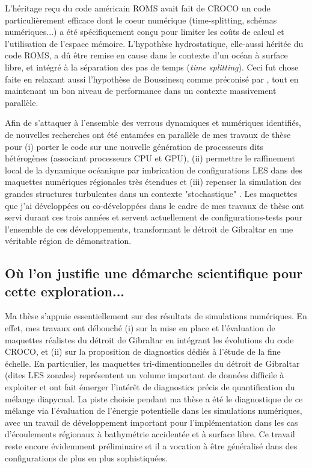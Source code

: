 L'héritage reçu du code américain ROMS \citep{shchepetkin_regional_2005} avait fait de CROCO un code particulièrement efficace dont le coeur numérique (time-splitting, schémas numériques...) a été spécifiquement conçu pour limiter les coûts de calcul et l'utilisation de l'espace mémoire. L'hypothèse hydrostatique, elle-aussi héritée du code ROMS, a dû être remise en cause dans le contexte d'un océan à surface libre, et intégré à la séparation des pas de temps (\textit{time splitting}). Ceci fut chose faite en relaxant aussi l'hypothèse de Boussinesq comme préconisé par \cite{Auclair2018}, tout en maintenant un bon niveau de performance dans un contexte massivement parallèle.


Afin de s'attaquer à l'ensemble des verrous dynamiques et numériques identifiés, de nouvelles recherches ont été entamées en parallèle de mes travaux de thèse pour (i) porter le code sur une nouvelle génération de processeurs dits hétérogènes (associant processeurs CPU et GPU), (ii) permettre le raffinement local de la dynamique océanique par imbrication de configurations LES dans des maquettes numériques régionales très étendues et (iii) repenser la simulation des grandes structures turbulentes dans un contexte "stochastique" \cite{memin_fluid_2014}. Les maquettes que j'ai développées ou co-développées dans le cadre de mes travaux de thèse ont servi durant ces trois années et servent actuellement de configurations-tests pour l'ensemble de ces développements, transformant le détroit de Gibraltar en une véritable région de démonstration.

\subsection{Où l'on justifie une démarche scientifique pour cette exploration...}

Ma thèse s'appuie essentiellement sur des résultats de simulations numériques. En effet, mes travaux ont débouché (i) sur la mise en place et l'évaluation de maquettes réalistes du détroit de Gibraltar en intégrant les évolutions du code CROCO, et (ii) sur la proposition de diagnostics dédiés à l'étude de la fine échelle. En particulier, les maquettes tri-dimentionnelles du détroit de Gibraltar (dites LES zonales) représentent un volume important de données difficile à exploiter et ont fait émerger l'intérêt de diagnostics précis de quantification du mélange diapycnal. La piste choisie pendant ma thèse a été le diagnostique de ce mélange via l'évaluation de l'énergie potentielle dans les simulations numériques, avec un travail de développement important pour l'implémentation dans les cas d'écoulements régionaux à bathymétrie accidentée et à surface libre. Ce travail reste encore évidemment préliminaire et il a vocation à être généralisé dans des configurations de plus en plus sophistiquées.

